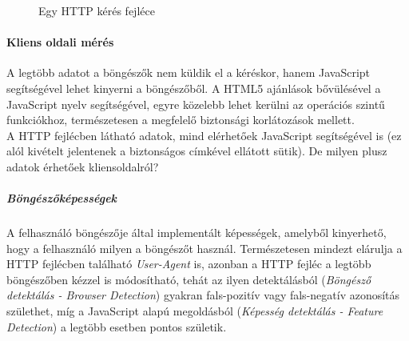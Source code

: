 \begin{figure}[ht]
	\centering
		
		\caption{Egy HTTP kérés fejléce}
		\label{fig:request_header}
\end{figure}

\paragraph{Kliens oldali mérés} %
\label{par:kliens_oldali_mérés}

A legtöbb adatot a böngészők nem küldik el a kéréskor, hanem JavaScript segítségével lehet kinyerni a böngészőből. A HTML5 ajánlások bővülésével a JavaScript nyelv segítségével, egyre közelebb lehet kerülni az operációs szintű funkciókhoz, természetesen a megfelelő biztonsági korlátozások mellett.\\

A HTTP fejlécben látható adatok, mind elérhetőek JavaScript segítségével is (ez alól kivételt jelentenek a biztonságos címkével ellátott sütik). De milyen plusz adatok érhetőek kliensoldalról?\hfill\\

\subparagraph{Böngészőképességek} %
\label{subp:bongeszokepessegek}
A felhasználó böngészője által implementált képességek, amelyből kinyerhető, hogy a felhasználó milyen a böngészőt használ. Természetesen mindezt elárulja a HTTP fejlécben található \textit{User-Agent} is, azonban a HTTP fejléc a legtöbb böngészőben kézzel is módosítható, tehát az ilyen detektálásból (\textit{Böngésző detektálás - Browser Detection}) gyakran fals-pozitív vagy fals-negatív azonosítás születhet, míg a JavaScript alapú megoldásból (\textit{Képesség detektálás - Feature Detection}) a legtöbb esetben pontos születik.

